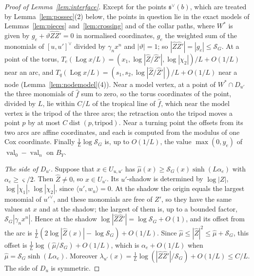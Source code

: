 \begin{proof}[Proof of Lemma~\ref{lem:interface}]
Except for the points $\mathfrak s^\vee(b)$, which are treated by Lemma~\ref{lem:possec}(2) below, the points in question
lie in the exact models of Lemmas~\ref{lem:pieces} and~\ref{lem:crossing} and of the collar paths,
where $W^*$ is given by $g_e+\vartheta\hat Z\hat Z'=0$ in normalised coordinates, $g_e$ the weighted sum of the monomials
of $[u,u']^\vee$ divided by $\gamma_nx^n$ and $|\vartheta|=1$; so $|\hat Z\hat Z'|=|g_e|\le\mathcal S_G$. At a point of the torus,
$T_e(\operatorname{Log}x/L)=(x_1,\log|\hat Z/\hat Z'|,\log|\chi_2|)/L+O(1/L)$ near an arc, and $T_q(\operatorname{Log}x/L)=
(s_1,s_2,\log|\hat Z/\hat Z'|)/L+O(1/L)$ near a node (Lemma~\ref{lem:nodemodel}(4)). Near a model vertex, at a point of
$W^*\cap D_{u'}$ the three monomials of $\hat f$ sum to zero, so the torus coordinates of the point, divided by $L$, lie
within $C/L$ of the tropical line of $\hat f$, which near the model vertex is the tripod of the three arcs; the retraction
onto the tripod moves a point $p$ by at most $C\operatorname{dist}(p,\text{tripod})$. Near a turning point the offsets from
its two arcs are affine coordinates, and each is computed from the modulus of one Cox coordinate. Finally $\frac1L\log
\mathcal S_G$ is, up to $O(1/L)$, the value $\max(0,y_e)$ of $\operatorname{val}_0-\operatorname{val}_n$ on $B_Y$.

\emph{The side of $D_{u'}$.} Suppose that $x\in U_{u,u'}$ has $\hat\mu(x)\ge\mathcal S_G(x)\sinh(L\alpha_e)$ with $\alpha_e\ge
\varsigma/2$. Then $\hat Z\ne0$, so $x\in U_{u'}$. Its $u'$-shadow is determined by $\log|Z|$, $\log|\chi_1|$, $\log|\chi_2|$,
since $\langle u',w_u\rangle=0$. At the shadow the origin equals the largest monomial of $u'^\vee$, and these monomials are
free of $Z'$, so they have the same values at $x$ and at the shadow; the largest of them is, up to a bounded factor,
$\mathcal S_G|\gamma_nx^n|$. Hence at the shadow $\log|\hat Z\hat Z'|=\log\mathcal S_G+O(1)$, and its offset from the arc is
$\frac1L(2\log|\hat Z(x)|-\log\mathcal S_G)+O(1/L)$. Since $\hat\mu\le|\hat Z|^2\le\hat\mu+\mathcal S_G$, this offset is
$\frac1L\log(\hat\mu/\mathcal S_G)+O(1/L)$, which is $\alpha_e+O(1/L)$ when $\hat\mu=\mathcal S_G\sinh(L\alpha_e)$. Moreover
$\lambda_{u'}(x)=\frac1L\log(|\hat Z\hat Z'|/\mathcal S_G)+O(1/L)\le C/L$. The side of $D_u$ is symmetric.


\end{proof}
